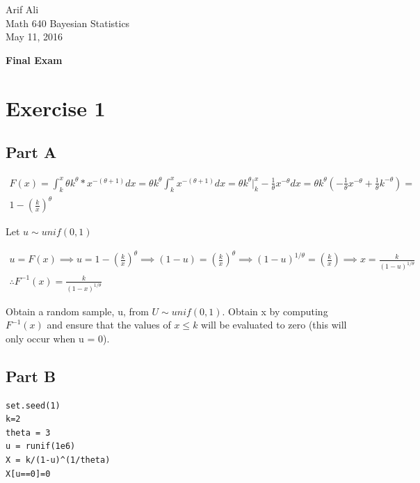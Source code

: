 \documentclass{article}\usepackage[]{graphicx}\usepackage[]{color}
\makeatletter
\newenvironment{kframe}{%
 \def\at@end@of@kframe{}%
 \ifinner\ifhmode%
  \def\at@end@of@kframe{\end{minipage}}%
  \begin{minipage}{\columnwidth}%
 \fi\fi%
 \def\FrameCommand##1{\hskip\@totalleftmargin \hskip-\fboxsep
 \colorbox{shadecolor}{##1}\hskip-\fboxsep
     \hskip-\linewidth \hskip-\@totalleftmargin \hskip\columnwidth}%
 \MakeFramed {\advance\hsize-\width
   \@totalleftmargin\z@ \linewidth\hsize
   \@setminipage}}%
 {\par\unskip\endMakeFramed%
 \at@end@of@kframe}
\newenvironment{knitrout}{}{} %
\makeatother
\begin{document}
\begin{flushright}
Arif Ali\\
Math 640 Bayesian Statistics\\
May 11, 2016\\
\end{flushright}

\begin{center}
\LARGE\textbf{Final Exam}
  \end{center}
\section*{Exercise 1}
\subsection*{Part A}
\begin{equation}
\begin{split}
F(x)=\int_{k}^{x}\theta k^{\theta}*x^{-(\theta+1)}dx=\theta k^{\theta}\int_{k}^{x}x^{-(\theta+1)}dx=\theta k^{\theta}\big|_{k}^{x}-\frac{1}{\theta}x^{-\theta}dx=\theta k^{\theta}\left(-\frac{1}{\theta}x^{-\theta}+\frac{1}{\theta}k^{-\theta}\right)= \\
1-\left(\frac{k}{x}\right)^{\theta}
\end{split}
\end{equation} 


Let $u\sim unif(0,1)$

\begin{equation}
\begin{split}
u = F(x)\implies u = 1-\left(\frac{k}{x}\right)^{\theta}\implies (1-u) = \left(\frac{k}{x}\right)^{\theta}\implies(1-u)^{1/\theta} = \left(\frac{k}{x}\right) \implies x = \frac{k}{(1-u)^{1/\theta}}\\
\therefore F^{-1}(x) = \frac{k}{(1-x)^{1/\theta}}
\end{split}
\end{equation} 

Obtain a random sample, u, from $U\sim unif(0,1)$. Obtain x by computing $F^{-1}(x)$ and ensure that the values of $x\leq k$ will be evaluated to zero (this will only occur when u = 0).
\subsection*{Part B}
\begin{knitrout}
\color{fgcolor}\begin{kframe}
\begin{verbatim}
set.seed(1)
k=2
theta = 3
u = runif(1e6)
X = k/(1-u)^(1/theta)
X[u==0]=0
\end{verbatim}
\end{kframe}
\end{knitrout}
\end{document}
